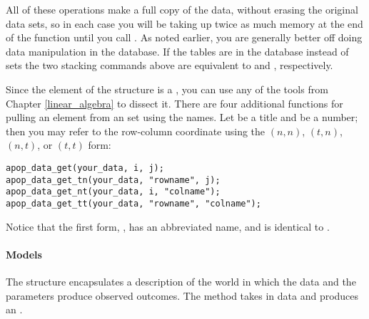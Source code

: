 All of these operations make a full copy of the data, without
erasing the original data sets, so in each case
you will be taking up twice as much memory
at the end of the function until you call
. As
noted earlier, you are generally better off doing data manipulation
in the database. If the tables are in the database instead of
 sets the two stacking commands above are equivalent
to 
and ,
respectively.

Since the  element of the  structure
is a , you can use any of the tools from Chapter
\ref{linear_algebra} to dissect it.
There are four additional functions for pulling an element from an
 set using the names. Let  be a title and
 be a number; then you may refer to the row-column coordinate
using the $(n,n)$, $(t,n)$, $(n,t)$, or $(t,t)$ form:
\begin{lstlisting}
apop_data_get(your_data, i, j);
apop_data_get_tn(your_data, "rowname", j);
apop_data_get_nt(your_data, i, "colname");
apop_data_get_tt(your_data, "rowname", "colname");
\end{lstlisting}
Notice that the first form, , has an abbreviated
name, and is identical to .


\paragraph{Models}
The  structure encapsulates a description of the world
in which the data and the parameters produce observed outcomes. The
 method takes in data and produces an . 


